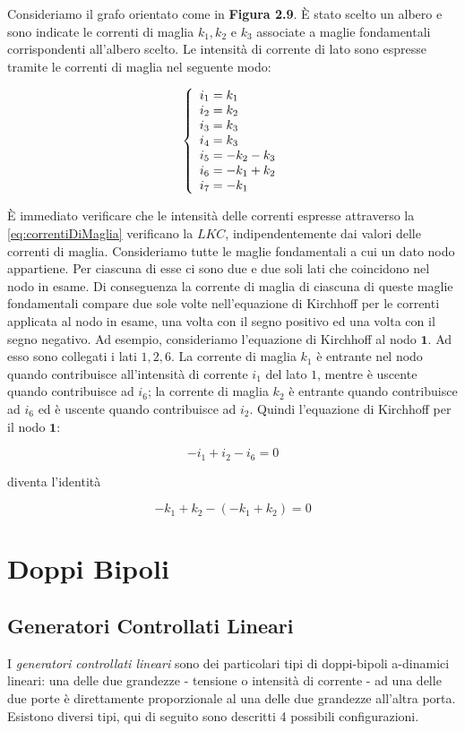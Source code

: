 \documentclass[a4paper]{report}
\begin{document}
Consideriamo il grafo orientato come in {\bf Figura 2.9}. \`E stato
scelto un albero e sono indicate le correnti di maglia $k_1,k_2$ e
$k_3$ associate a maglie fondamentali corrispondenti all'albero
scelto. Le intensit\`a di corrente di lato sono espresse tramite le
correnti di maglia nel seguente modo:

\begin{equation}\label{eq:correntiDiMaglia}
\left\{
\begin{array}{l l l l l l l}
  i_1=k_1\\
  i_2=k_2\\
  i_3=k_3\\
  i_4=k_3\\
  i_5=-k_2-k_3\\
  i_6=-k_1+k_2\\
  i_7=-k_1
\end{array} \right.
\end{equation}

\`E immediato verificare che le intensit\`a delle correnti espresse
attraverso la \ref{eq:correntiDiMaglia} verificano la $LKC$,
indipendentemente dai valori delle correnti di maglia. Consideriamo
tutte le maglie fondamentali a cui un dato nodo appartiene. Per
ciascuna di esse ci sono due e due soli lati che coincidono nel nodo
in esame. Di conseguenza la corrente di maglia di ciascuna di queste
maglie fondamentali compare due sole volte nell'equazione di
Kirchhoff per le correnti applicata al nodo in esame, una volta con il
segno positivo ed una volta con il segno negativo. 
Ad esempio, consideriamo l'equazione di Kirchhoff al nodo
$\mathbf{1}$. Ad esso sono collegati i lati $1,2,6$. La corrente di
maglia $k_1$ \`e entrante nel nodo quando contribuisce all'intensit\`a
di corrente $i_1$ del lato $1$, mentre \`e uscente quando contribuisce
ad $i_6$; la corrente di maglia $k_2$ \`e entrante quando contribuisce
ad $i_6$ ed \`e uscente quando contribuisce ad $i_2$. Quindi
l'equazione di Kirchhoff per il nodo $\mathbf{1}$:

\[
-i_1+i_2-i_6=0
\]

diventa l'identit\`a

\[
-k_1+k_2-(-k_1+k_2)=0
\]

\chapter{Doppi Bipoli}
\section{Generatori Controllati Lineari}
I \emph{generatori controllati lineari} sono dei particolari tipi di
doppi-bipoli a-dinamici lineari: una delle due grandezze - tensione o
intensit\`a di corrente - ad una delle due porte \`e direttamente
proporzionale al una delle due grandezze all'altra porta. Esistono
diversi tipi, qui di seguito sono descritti 4 possibili
configurazioni.
\end{document}
